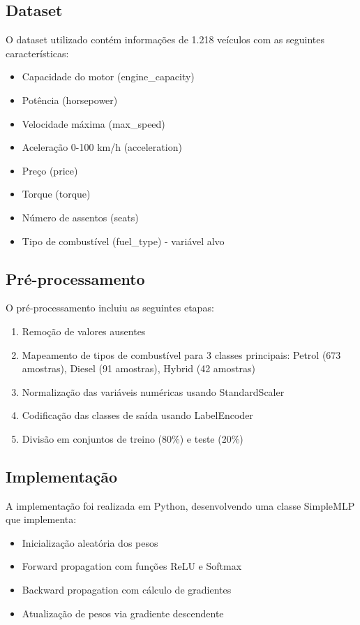 \documentclass[12pt]{article}
\begin{document}
\subsection{Dataset}

O dataset utilizado contém informações de 1.218 veículos com as seguintes características:
\begin{itemize}
    \item Capacidade do motor (engine\_capacity)
    \item Potência (horsepower)  
    \item Velocidade máxima (max\_speed)
    \item Aceleração 0-100 km/h (acceleration)
    \item Preço (price)
    \item Torque (torque)
    \item Número de assentos (seats)
    \item Tipo de combustível (fuel\_type) - variável alvo
\end{itemize}

\subsection{Pré-processamento}

O pré-processamento incluiu as seguintes etapas:
\begin{enumerate}
    \item Remoção de valores ausentes
    \item Mapeamento de tipos de combustível para 3 classes principais: Petrol (673 amostras), Diesel (91 amostras), Hybrid (42 amostras)
    \item Normalização das variáveis numéricas usando StandardScaler
    \item Codificação das classes de saída usando LabelEncoder
    \item Divisão em conjuntos de treino (80\%) e teste (20\%)
\end{enumerate}

\subsection{Implementação}

A implementação foi realizada em Python, desenvolvendo uma classe SimpleMLP que implementa:
\begin{itemize}
    \item Inicialização aleatória dos pesos
    \item Forward propagation com funções ReLU e Softmax
    \item Backward propagation com cálculo de gradientes
    \item Atualização de pesos via gradiente descendente
\end{itemize}
\end{document}
